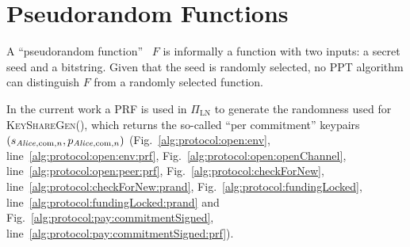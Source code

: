 \section{Pseudorandom Functions}
\label{sec:prf}
  A ``pseudorandom function''~\cite{katzlindell} $F$ is informally a function
  with two inputs: a secret seed and a bitstring. Given that the seed is
  randomly selected, no PPT algorithm can distinguish $F$ from a randomly
  selected function.

  In the current work a PRF is used in $\Pi_{\mathrm{LN}}$ to generate the
  randomness used for \textsc{KeyShareGen}(), which returns the so-called ``per
  commitment'' keypairs $(s_{\mathit{Alice}, \mathrm{com}, n}, p_{\mathit{Alice}, \mathrm{com},
  n})$ (Fig.~\ref{alg:protocol:open:env}, line~\ref{alg:protocol:open:env:prf},
  Fig.~\ref{alg:protocol:open:openChannel},
  line~\ref{alg:protocol:open:peer:prf}, Fig.~\ref{alg:protocol:checkForNew},
  line~\ref{alg:protocol:checkForNew:prand},
  Fig.~\ref{alg:protocol:fundingLocked},
  line~\ref{alg:protocol:fundingLocked:prand} and
  Fig.~\ref{alg:protocol:pay:commitmentSigned},
  line~\ref{alg:protocol:pay:commitmentSigned:prf}).

